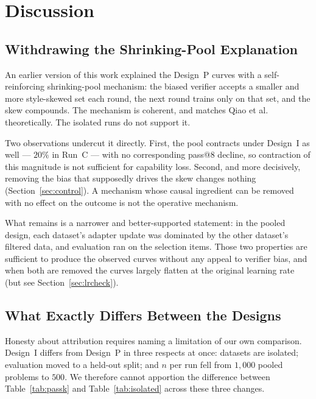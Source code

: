 \documentclass[runningheads]{llncs}
\begin{document}
\section{Discussion}
\label{sec:discussion}

\subsection{Withdrawing the Shrinking-Pool Explanation}

An earlier version of this work explained the Design~P curves with a
self-reinforcing shrinking-pool mechanism: the biased verifier accepts a
smaller and more style-skewed set each round, the next round trains only on
that set, and the skew compounds. The mechanism is coherent, and matches
Qiao et al.~\cite{ref_selectionbias} theoretically. The isolated runs do
not support it.

Two observations undercut it directly. First, the pool contracts under
Design~I as well --- $20\%$ in Run~C --- with no corresponding pass@8
decline, so contraction of this magnitude is not sufficient for capability
loss. Second, and more decisively, removing the bias that supposedly drives
the skew changes nothing (Section~\ref{sec:control}). A mechanism whose
causal ingredient can be removed with no effect on the outcome is not the
operative mechanism.

What remains is a narrower and better-supported statement: in the pooled
design, each dataset's adapter update was dominated by the other dataset's
filtered data, and evaluation ran on the selection items. Those two
properties are sufficient to produce the observed curves without any appeal
to verifier bias, and when both are removed the curves largely flatten at the original
learning rate (but see Section~\ref{sec:lrcheck}).

\subsection{What Exactly Differs Between the Designs}
\label{sec:threevars}

Honesty about attribution requires naming a limitation of our own
comparison. Design~I differs from Design~P in three respects at once:
datasets are isolated; evaluation moved to a held-out split; and $n$ per run
fell from $1{,}000$ pooled problems to $500$. We therefore cannot apportion
the difference between Table~\ref{tab:passk} and Table~\ref{tab:isolated}
across these three changes.
\end{document}
